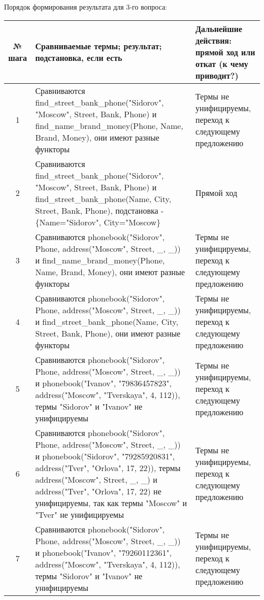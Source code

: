 \documentclass[a4paper,12pt]{article}
\begin{document}
\newpage
Порядок формирования результата для 3-го вопроса:
\begin{table}[ht!] 
	\begin{tabularx}{\linewidth}{|c|>{\centering}X|>{\centering}X|}
		\hline
		№ шага & Сравниваемые термы; результат; подстановка, если есть & Дальнейшие действия: прямой ход или откат (к чему приводит?)\tabularnewline
		\hline
		1 & Сравниваются find\_street\_bank\_phone("Sidorov"{}, "Moscow"{}, Street, Bank, Phone) и find\_name\_brand\_money(Phone, Name, Brand, Money), они имеют разные функторы & Термы не унифицируемы, переход к следующему предложению \tabularnewline
		\hline
		2 & Сравниваются find\_street\_bank\_phone("Sidorov"{}, "Moscow"{}, Street, Bank, Phone) и find\_street\_bank\_phone(Name, City, Street, Bank, Phone), подстановка - \{Name="Sidorov"{}, City="Moscow\} & Прямой ход \tabularnewline
		\hline
		3 & Сравниваются phonebook("Sidorov"{}, Phone, address("Moscow"{}, Street, \_, \_)) и find\_name\_brand\_money(Phone, Name, Brand, Money), они имеют разные функторы & Термы не унифицируемы, переход к следующему предложению \tabularnewline
		\hline
		4 & Сравниваются phonebook("Sidorov"{}, Phone, address("Moscow"{}, Street, \_, \_)) и find\_street\_bank\_phone(Name, City, Street, Bank, Phone), они имеют разные функторы & Термы не унифицируемы, переход к следующему предложению \tabularnewline
		\hline
		5 & Сравниваются phonebook("Sidorov"{}, Phone, address("Moscow"{}, Street, \_, \_)) и phonebook("Ivanov"{}, "79836457823"{}, address("Moscow"{}, "Tverskaya"{}, 4, 112)), термы "Sidorov" и "Ivanov" не унифицируемы & Термы не унифицируемы, переход к следующему предложению \tabularnewline
		\hline
		6 & Сравниваются phonebook("Sidorov"{}, Phone, address("Moscow"{}, Street, \_, \_)) и phonebook("Sidorov"{}, "79285920831"{}, address("Tver"{}, "Orlova"{}, 17, 22)), термы address("Moscow"{}, Street, \_, \_) и address("Tver"{}, "Orlova"{}, 17, 22) не унифицируемы, так как термы "Moscow"{} и "Tver" не унифицируемы & Термы не унифицируемы, переход к следующему предложению\tabularnewline
		\hline
		7 & Сравниваются phonebook("Sidorov"{}, Phone, address("Moscow"{}, Street, \_, \_)) и phonebook("Ivanov"{}, "79260112361"{}, address("Moscow"{}, "Tverskaya"{}, 4, 112)), термы "Sidorov"{} и "Ivanov"{} не унифицируемы & Термы не унифицируемы, переход к следующему предложению\tabularnewline
		\hline
	\end{tabularx}
\end{table}
\newpage
\end{document}
